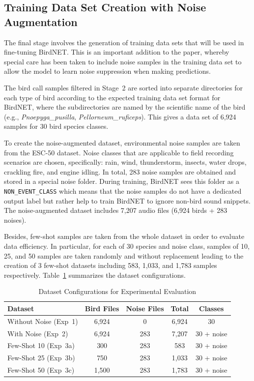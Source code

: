 \documentclass[conference]{IEEEtran}
\begin{document}
\subsection{Training Data Set Creation with Noise Augmentation}

The final stage involves the generation of training data sets that will be used in fine-tuning BirdNET. This is an important addition to the paper, whereby special care has been taken to include noise samples in the training data set to allow the model to learn noise suppression when making predictions.

The bird call samples filtered in Stage~2 are sorted into separate directories for each type of bird according to the expected training data set format for BirdNET, where the subdirectories are named by the scientific name of the bird (e.g., \textit{Pnoepyga\_pusilla}, \textit{Pellorneum\_ruficeps}). This gives a data set of 6,924 samples for 30 bird species classes.

To create the noise-augmented dataset, environmental noise samples are taken from the ESC-50 \cite{b2} dataset. Noise classes that are applicable to field recording scenarios are chosen, specifically: rain, wind, thunderstorm, insects, water drops, crackling fire, and engine idling. In total, 283 noise samples are obtained and stored in a special noise folder. During training, BirdNET sees this folder as a \texttt{NON\_EVENT\_CLASS} which means that the noise samples do not have a dedicated output label but rather help to train BirdNET to ignore non-bird sound snippets. The noise-augmented dataset includes 7,207 audio files (6,924 birds + 283 noises).

Besides, few-shot samples are taken from the whole dataset in order to evaluate data efficiency. In particular, for each of 30 species and noise class, samples of 10, 25, and 50 samples are taken randomly and without replacement leading to the creation of 3 few-shot datasets including 583, 1,033, and 1,783 samples respectively. Table~\ref{tab:datasets} summarizes the dataset configurations.

\begin{table}[htbp]
\caption{Dataset Configurations for Experimental Evaluation}
\label{tab:datasets}
\centering
\begin{tabular}{lcccc}
\toprule
\textbf{Dataset} & \textbf{Bird Files} & \textbf{Noise Files} & \textbf{Total} & \textbf{Classes} \\
\midrule
Without Noise (Exp~1) & 6,924 & 0 & 6,924 & 30 \\
With Noise (Exp~2) & 6,924 & 283 & 7,207 & 30 + noise \\
Few-Shot 10 (Exp~3a) & 300 & 283 & 583 & 30 + noise \\
Few-Shot 25 (Exp~3b) & 750 & 283 & 1,033 & 30 + noise \\
Few-Shot 50 (Exp~3c) & 1,500 & 283 & 1,783 & 30 + noise \\
\bottomrule
\end{tabular}
\end{table}
\end{document}
